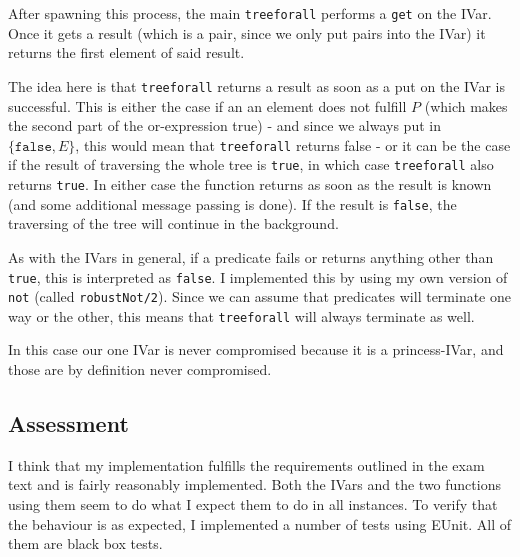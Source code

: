 \documentclass[a4paper]{article}
\begin{document}
\begin{itemize}
  After spawning this process, the main \texttt{treeforall} performs a \texttt{get} on the IVar. Once it gets a result (which is a pair, since we only put pairs into the IVar) it returns the first element of said result.
  
  The idea here is that \texttt{treeforall} returns a result as soon as a put on the IVar is successful. This is either the case if an an element does not fulfill $P$ (which makes the second part of the or-expression true) - and since we always put in $\{\texttt{false}, E\}$, this would mean that \texttt{treeforall} returns false - or it can be the case if the result of traversing the whole tree is \texttt{true}, in which case \texttt{treeforall} also returns \texttt{true}. In either case the function returns as soon as the result is known (and some additional message passing is done). If the result is \texttt{false}, the traversing of the tree will continue in the background. 
  
  As with the IVars in general, if a predicate fails or returns anything other than \texttt{true}, this is interpreted as \texttt{false}. I implemented this by using my own version of \texttt{not} (called \texttt{robustNot/2}). Since we can assume that predicates will terminate one way or the other, this means that \texttt{treeforall} will always terminate as well.
  
  In this case our one IVar is never compromised because it is a princess-IVar, and those are by definition never compromised.
\end{itemize}

\subsection*{Assessment}
I think that my implementation fulfills the requirements outlined in the exam text and is fairly reasonably implemented. Both the IVars and the two functions using them seem to do what I expect them to do in all instances. To verify that the behaviour is as expected, I implemented a number of tests using EUnit. All of them are black box tests. 
\end{document}
